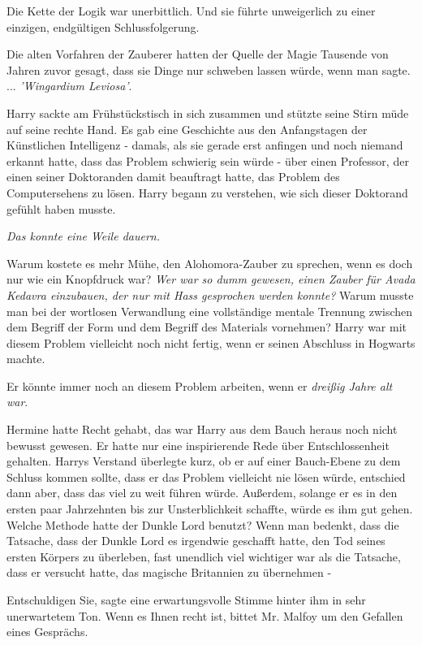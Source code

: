 Die Kette der Logik war unerbittlich. Und sie führte unweigerlich zu einer
einzigen, endgültigen Schlussfolgerung.

Die alten Vorfahren der Zauberer hatten der Quelle der Magie Tausende von Jahren
zuvor gesagt, dass sie Dinge nur schweben lassen würde, wenn man sagte.
...\emph{ 'Wingardium Leviosa'}.

Harry sackte am Frühstückstisch in sich zusammen und stützte seine Stirn müde
auf seine rechte Hand. Es gab eine Geschichte aus den Anfangstagen der
Künstlichen Intelligenz - damals, als sie gerade erst anfingen und noch niemand
erkannt hatte, dass das Problem schwierig sein würde - über einen Professor, der
einen seiner Doktoranden damit beauftragt hatte, das Problem des Computersehens
zu lösen. Harry begann zu verstehen, wie sich dieser Doktorand gefühlt haben
musste.

\emph{Das konnte eine Weile dauern.}

Warum kostete es mehr Mühe, den Alohomora-Zauber zu sprechen, wenn es doch nur
wie ein Knopfdruck war? \emph{Wer war so dumm gewesen, einen Zauber für Avada
Kedavra einzubauen, der nur mit Hass gesprochen werden konnte?} Warum musste man
bei der wortlosen Verwandlung eine vollständige mentale Trennung zwischen dem
Begriff der Form und dem Begriff des Materials vornehmen? Harry war mit diesem
Problem vielleicht noch nicht fertig, wenn er seinen Abschluss in Hogwarts
machte.

Er könnte immer noch an diesem Problem arbeiten, wenn er \emph{dreißig Jahre alt
war}.

Hermine hatte Recht gehabt, das war Harry aus dem Bauch heraus noch nicht
bewusst gewesen. Er hatte nur eine inspirierende Rede über Entschlossenheit
gehalten. Harrys Verstand überlegte kurz, ob er auf einer Bauch-Ebene zu dem
Schluss kommen sollte, dass er das Problem vielleicht nie lösen würde, entschied
dann aber, dass das viel zu weit führen würde. Außerdem, solange er es in den
ersten paar Jahrzehnten bis zur Unsterblichkeit schaffte, würde es ihm gut
gehen. Welche Methode hatte der Dunkle Lord benutzt? Wenn man bedenkt, dass die
Tatsache, dass der Dunkle Lord es irgendwie geschafft hatte, den Tod seines
ersten Körpers zu überleben, fast unendlich viel wichtiger war als die Tatsache,
dass er versucht hatte, das magische Britannien zu übernehmen -

\glqq{}Entschuldigen Sie\grqq{}, sagte eine erwartungsvolle Stimme hinter ihm in
sehr unerwartetem Ton. \glqq{}Wenn es Ihnen recht ist, bittet Mr. Malfoy um den
Gefallen eines Gesprächs.\grqq{}

